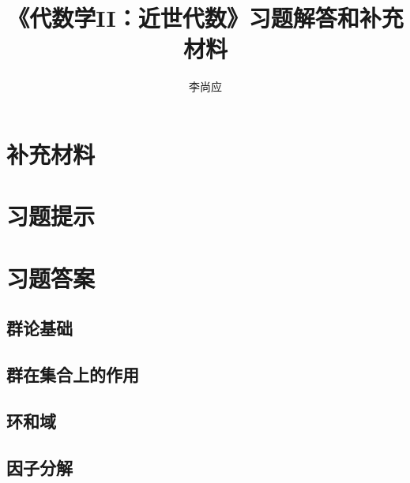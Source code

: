 \documentclass{ctexbook}
\title{《代数学II：近世代数》习题解答和补充材料}
\author{李尚应}
\begin{document}
	\maketitle
	\tableofcontents
	\part*{}
	
	
	
	
	\part{补充材料}
	\setcounter{chapter}{0}
	
	\setcounter{chapter}{7}
	
	\part{习题提示}
	\part{习题答案}
	\setcounter{chapter}{0}
	\chapter{群论基础}
		
		
		
		
	\chapter{群在集合上的作用}
		
		
		
		
		
		
	\chapter{环和域}
		
		
		
		
	\chapter{因子分解}
		
		
		
\end{document}
